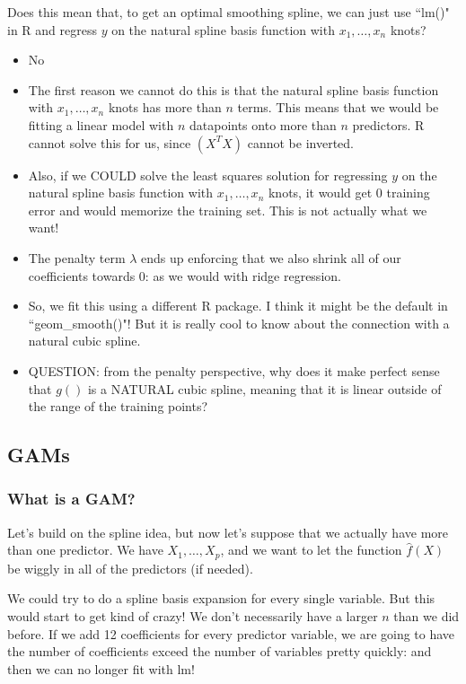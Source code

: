 Does this mean that, to get an optimal smoothing spline, we can just use ``lm()" in R and regress $y$ on the natural spline basis function with $x_1,\ldots, x_n$ knots? 
\begin{itemize}
\item No
\item The first reason we cannot do this is that the natural spline basis function with $x_1,\ldots, x_n$ knots has more than $n$ terms. This means that we would be fitting a linear model with $n$ datapoints onto more than $n$ predictors. R cannot solve this for us, since $(X^TX)$ cannot be inverted.
\item Also, if we COULD solve the least squares solution for regressing $y$ on the natural spline basis function with $x_1,\ldots, x_n$ knots, it would get $0$ training error and would memorize the training set. This is not actually what we want!
\item The penalty term $\lambda$ ends up enforcing that we also shrink all of our coefficients towards $0$: as we would with ridge regression.
\item So, we fit this using a different R package. I think it might be the default in ``geom\_smooth()"! But it is really cool to know about the connection with a natural cubic spline.
\item QUESTION: from the penalty perspective, why does it make perfect sense that $g()$ is a NATURAL cubic spline, meaning that it is linear outside of the range of the training points? 
\end{itemize}

\subsection{GAMs}

\subsubsection{What is a GAM?}

Let's build on the spline idea, but now let's suppose that we actually have more than one predictor. We have $X_1, \ldots, X_p$, and we want to let the function $\hat{f}(X)$ be wiggly in all of the predictors (if needed).

We could try to do a spline basis expansion for every single variable. But this would start to get kind of crazy! We don't necessarily have a larger $n$ than we did before. If we add 12 coefficients for every predictor variable, we are going to have the number of coefficients exceed the number of variables pretty quickly: and then we can no longer fit with lm! 

